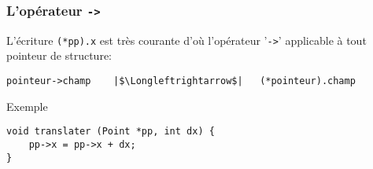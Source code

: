 \documentclass[table,handout,tikz,12pt,svgnames]{beamer}
\begin{document}
\begin{frame}[fragile=singleslide]
	\frametitle{L'opérateur \texttt{->}}
	\vspace{-0.7cm}
	\begin{itemize}
	\vspace{.3cm}
	\end{itemize}
				\begin{verbatim}
pointeur->champ    |$\Longleftrightarrow$|   (*pointeur).champ
				\end{verbatim}
	\begin{itemize}
		\begin{block}{}
			\item Exemple
		\end{block}
	\vspace{-0.2cm}	
	\end{itemize}
				\begin{verbatim}
void translater (Point *pp, int dx) {
	pp->x = pp->x + dx;
}
				\end{verbatim}
\end{frame}



\end{document}
